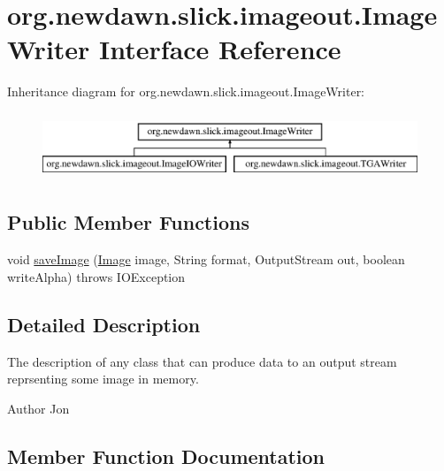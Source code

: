 \hypertarget{interfaceorg_1_1newdawn_1_1slick_1_1imageout_1_1_image_writer}{}\section{org.\+newdawn.\+slick.\+imageout.\+Image\+Writer Interface Reference}
\label{interfaceorg_1_1newdawn_1_1slick_1_1imageout_1_1_image_writer}
Inheritance diagram for org.\+newdawn.\+slick.\+imageout.\+Image\+Writer\+:\begin{figure}[H]
\begin{center}
\leavevmode
\includegraphics[height=2.000000cm]{interfaceorg_1_1newdawn_1_1slick_1_1imageout_1_1_image_writer}
\end{center}
\end{figure}
\subsection*{Public Member Functions}
\begin{DoxyCompactItemize}
\item 
void \mbox{\hyperlink{interfaceorg_1_1newdawn_1_1slick_1_1imageout_1_1_image_writer_ad911f19d2f2c9e9925c73510018423b9}{save\+Image}} (\mbox{\hyperlink{classorg_1_1newdawn_1_1slick_1_1_image}{Image}} image, String format, Output\+Stream out, boolean write\+Alpha)  throws I\+O\+Exception
\end{DoxyCompactItemize}


\subsection{Detailed Description}
The description of any class that can produce data to an output stream reprsenting some image in memory.

\begin{DoxyAuthor}{Author}
Jon 
\end{DoxyAuthor}


\subsection{Member Function Documentation}
\mbox{\label{interfaceorg_1_1newdawn_1_1slick_1_1imageout_1_1_image_writer_ad911f19d2f2c9e9925c73510018423b9}} 

